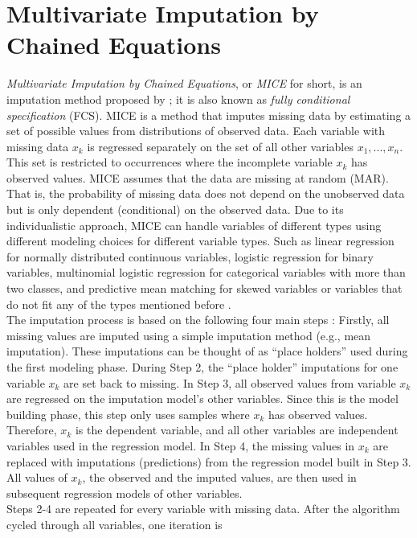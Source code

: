 \section{Multivariate Imputation by Chained Equations}
\textit{Multivariate Imputation by Chained Equations}, or \textit{MICE} for 
short, is an imputation method proposed by \citeauthor{RN135} \cite{RN135}; it 
is also known as \textit{fully conditional specification} (FCS).
MICE is a method that imputes missing data by estimating a set of possible 
values from distributions of observed data. Each variable with missing data 
$x_k$ is regressed separately on the set of all other variables $x_1,..., x_n$. 
This set is restricted to occurrences where the incomplete variable $x_k$ has 
observed values.
MICE assumes that the data are missing at random (MAR). That is, the 
probability of missing data does not depend on the unobserved data but is only 
dependent (conditional) on the observed data. Due to its individualistic 
approach, MICE can handle variables of different types using different 
modeling choices for different variable types. Such as linear regression for 
normally distributed continuous variables, logistic regression for binary 
variables, multinomial logistic regression for categorical variables with more 
than two classes, and predictive mean matching for skewed variables or variables 
that do not fit any of the types mentioned before \cite{RN142, RN141}.
\\
The imputation process is based on the following four main steps \cite{RN142, 
RN141}: Firstly, all missing values are imputed using a simple imputation 
method (e.g., mean imputation). These imputations can be thought of as ``place 
holders'' used during the first modeling phase. During Step 2, the ``place 
holder'' imputations for one variable $x_k$ are set back to missing. In 
Step 3, all observed values from variable $x_k$ are regressed on 
the imputation model's other variables. Since this is the model building 
phase, this step only uses samples where $x_k$ has observed values. 
Therefore, $x_k$ is the dependent variable, and all other variables are 
independent variables used in the regression model. In Step 4, the missing 
values in $x_k$ are replaced with imputations (predictions) from the 
regression model built in Step 3. All values of $x_k$, the observed and the 
imputed values, are then used in subsequent regression models of other 
variables.
\\
Steps 2-4 are repeated for every variable with missing data. After the 
algorithm cycled through all variables, one iteration is 
